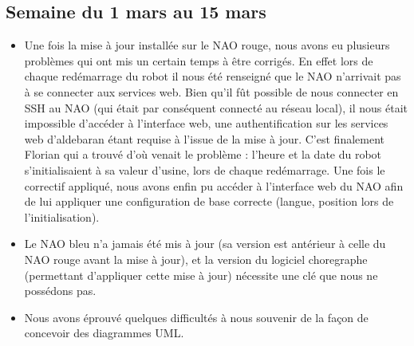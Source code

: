   \subsection{Semaine du 1 mars au 15 mars}
  \label{sub:Semaine du 1 mars au 15 mars}
    \begin{itemize}
      \item Une fois la mise à jour installée sur le NAO rouge, nous avons eu plusieurs problèmes qui ont mis un certain temps à être corrigés.
      En effet lors de chaque redémarrage du robot il nous été renseigné que le NAO n’arrivait pas à se connecter aux services web.
      Bien qu’il fût possible de nous connecter en SSH au NAO (qui était par conséquent connecté au réseau local),
      il nous était impossible d’accéder à l’interface web, une authentification sur les services web d’aldebaran étant requise à l’issue de la mise à jour.
      C’est finalement Florian qui a trouvé d’où venait le problème : l’heure et la date du robot s’initialisaient à sa valeur d’usine, lors de chaque redémarrage.
      Une fois le correctif appliqué, nous avons enfin pu accéder à l’interface web du NAO afin de
      lui appliquer une configuration de base correcte (langue, position lors de l’initialisation).
      \item Le NAO bleu n’a jamais été mis à jour (sa version est antérieur à celle du NAO rouge avant la mise à jour),
      et la version du logiciel choregraphe (permettant d’appliquer cette mise à jour) nécessite une clé que nous ne possédons pas.
      \item Nous avons éprouvé quelques difficultés à nous souvenir de la façon de concevoir des diagrammes UML.\\
    \end{itemize}



